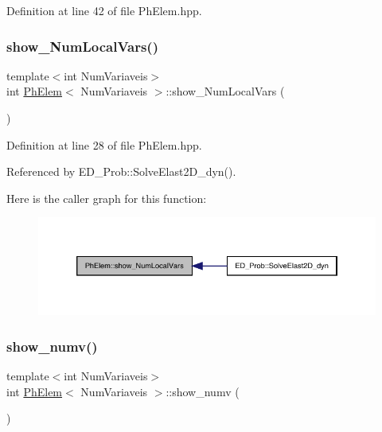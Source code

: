 Definition at line 42 of file Ph\+Elem.\+hpp.

\mbox{\label{classPhElem_a5288b2eba55ffa37f1a9866a516f6886}} 
\subsubsection{\texorpdfstring{show\+\_\+\+Num\+Local\+Vars()}{show\_NumLocalVars()}}
{\footnotesize\ttfamily template$<$int Num\+Variaveis$>$ \\
int \hyperlink{classPhElem}{Ph\+Elem}$<$ Num\+Variaveis $>$\+::show\+\_\+\+Num\+Local\+Vars (\begin{DoxyParamCaption}{ }\end{DoxyParamCaption})\hspace{0.3cm}{\ttfamily [inline]}}



Definition at line 28 of file Ph\+Elem.\+hpp.



Referenced by E\+D\+\_\+\+Prob\+::\+Solve\+Elast2\+D\+\_\+dyn().

Here is the caller graph for this function\+:
\nopagebreak
\begin{figure}[H]
\begin{center}
\leavevmode
\includegraphics[width=346pt]{classPhElem_a5288b2eba55ffa37f1a9866a516f6886_icgraph}
\end{center}
\end{figure}
\mbox{\label{classPhElem_a69a5cfc5b3b7faa4ad5f584311406ce1}} 
\subsubsection{\texorpdfstring{show\+\_\+numv()}{show\_numv()}}
{\footnotesize\ttfamily template$<$int Num\+Variaveis$>$ \\
int \hyperlink{classPhElem}{Ph\+Elem}$<$ Num\+Variaveis $>$\+::show\+\_\+numv (\begin{DoxyParamCaption}{ }\end{DoxyParamCaption})\hspace{0.3cm}{\ttfamily [inline]}}



